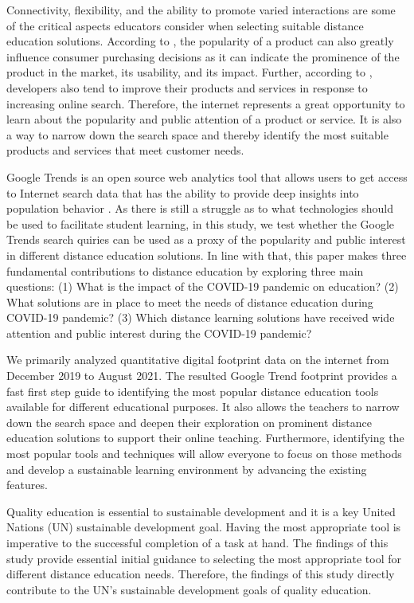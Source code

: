 \documentclass[11pt,a4paper,]{article}
\begin{document}
Connectivity, flexibility, and the ability to promote varied interactions are some of the critical aspects educators consider when selecting suitable distance education solutions. According to \textcite{ahn2006utilizing}, the popularity of a product can also greatly influence consumer purchasing decisions as it can indicate the prominence of the product in the market, its usability, and its impact. Further, according to \textcite{willis2020using}, developers also tend to improve their products and services in response to increasing online search. Therefore, the internet represents a great opportunity to learn about the popularity and public attention of a product or service. It is also a way to narrow down the search space and thereby identify the most suitable products and services that meet customer needs.

Google Trends is an open source web analytics tool that allows users to get access to Internet search data that has the ability to provide deep insights into population behavior \autocite{nuti2014use}. As there is still a struggle as to what technologies should be used to facilitate student learning, in this study, we test whether the Google Trends search quiries can be used as a proxy of the popularity and public interest in different distance education solutions. In line with that, this paper makes three fundamental contributions to distance education by exploring three main questions: (1) What is the impact of the COVID-19 pandemic on education? (2) What solutions are in place to meet the needs of distance education during COVID-19 pandemic? (3) Which distance learning solutions have received wide attention and public interest during the COVID-19 pandemic?

We primarily analyzed quantitative digital footprint data on the internet from December 2019 to August 2021. The resulted Google Trend footprint provides a fast first step guide to identifying the most popular distance education tools available for different educational purposes. It also allows the teachers to narrow down the search space and deepen their exploration on prominent distance education solutions to support their online teaching. Furthermore, identifying the most popular tools and techniques will allow everyone to focus on those methods and develop a sustainable learning environment by advancing the existing features.

Quality education is essential to sustainable development and it is a key United Nations (UN) sustainable development goal. Having the most appropriate tool is imperative to the successful completion of a task at hand. The findings of this study provide essential initial guidance to selecting the most appropriate tool for different distance education needs. Therefore, the findings of this study directly contribute to the UN's sustainable development goals of quality education.
\end{document}
